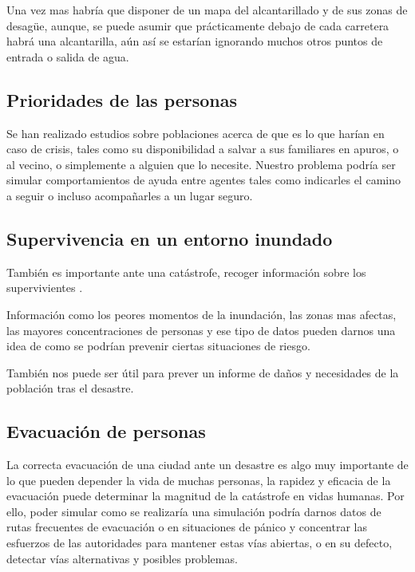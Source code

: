 Una vez mas habría que disponer de un mapa del alcantarillado y de sus zonas de
desagüe, aunque, se puede asumir que prácticamente debajo de cada carretera
habrá una alcantarilla, aún así se estarían ignorando muchos otros puntos de
entrada o salida de agua.

\subsection*{Prioridades de las personas}

Se han realizado estudios \cite{prioridades} sobre poblaciones acerca de que es
lo que harían en caso de crisis, tales como su disponibilidad a salvar a sus
familiares en apuros, o al vecino, o simplemente a alguien que lo necesite.
Nuestro problema podría ser simular comportamientos de ayuda entre agentes
tales como indicarles el camino a seguir o incluso acompañarles a un lugar
seguro.

\subsection*{Supervivencia en un entorno inundado}

También es importante ante una catástrofe, recoger información sobre los
supervivientes \cite{survey}.

Información como los peores momentos de la inundación, las zonas mas afectas,
las mayores concentraciones de personas y ese tipo de datos pueden darnos una
idea de como se podrían prevenir ciertas situaciones de riesgo.

También nos puede ser útil para prever un informe de daños y necesidades de la
población tras el desastre.

\subsection*{Evacuación de personas}
La correcta evacuación de una ciudad ante un desastre es algo muy importante de
lo que pueden depender la vida de muchas personas, la rapidez y eficacia de la
evacuación puede determinar la magnitud de la catástrofe en vidas humanas. Por
ello, poder simular como se realizaría una simulación podría darnos datos de
rutas frecuentes de evacuación \cite{evac08} o en situaciones de pánico
\cite{panicevac} y concentrar las esfuerzos de las autoridades para mantener
estas vías abiertas, o en su defecto, detectar vías alternativas y posibles
problemas.

